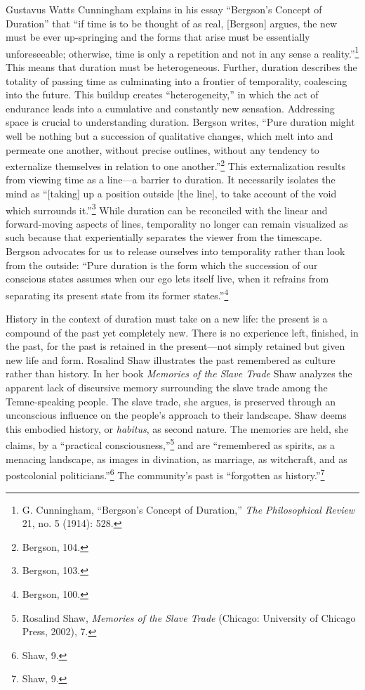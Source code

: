 Gustavus Watts Cunningham explains in his essay ``Bergson's Concept of
Duration'' that ``if time is to be thought of as real, {[}Bergson{]}
argues, the new must be ever up-springing and the forms that arise must
be essentially unforeseeable; otherwise, time is only a repetition and
not in any sense a reality.''\footnote{G. Cunningham, ``Bergson's
  Concept of Duration,'' \emph{The Philosophical Review} 21, no. 5
  (1914): 528.} This means that duration must be heterogeneous. Further,
duration describes the totality of passing time as culminating into a
frontier of temporality, coalescing into the future. This buildup
creates ``heterogeneity,'' in which the act of endurance leads into a
cumulative and constantly new sensation. Addressing space is crucial to
understanding duration. Bergson writes, ``Pure duration might well be
nothing but a succession of qualitative changes, which melt into and
permeate one another, without precise outlines, without any tendency to
externalize themselves in relation to one another.''\footnote{Bergson,
  104.} This externalization results from viewing time as a line---a
barrier to duration. It necessarily isolates the mind as ``{[}taking{]}
up a position outside {[}the line{]}, to take account of the void which
surrounds it.''\footnote{Bergson, 103.} While duration can be reconciled
with the linear and forward-moving aspects of lines, temporality no
longer can remain visualized as such because that experientially
separates the viewer from the timescape. Bergson advocates for us to
release ourselves into temporality rather than look from the outside:
``Pure duration is the form which the succession of our conscious states
assumes when our ego lets itself live, when it refrains from separating
its present state from its former states.''\footnote{Bergson, 100.}

History in the context of duration must take on a new life: the present
is a compound of the past yet completely new. There is no experience
left, finished, in the past, for the past is retained in the
present---not simply retained but given new life and form. Rosalind Shaw
illustrates the past remembered as culture rather than history. In her
book \emph{Memories of the Slave Trade} Shaw analyzes the apparent lack
of discursive memory surrounding the slave trade among the
Temne-speaking people. The slave trade, she argues, is preserved through
an unconscious influence on the people's approach to their landscape.
Shaw deems this embodied history, or \emph{habitus}, as second nature.
The memories are held, she claims, by a ``practical
consciousness,''\footnote{Rosalind Shaw, \emph{Memories of the Slave
  Trade} (Chicago: University of Chicago Press, 2002), 7.} and are
``remembered as spirits, as a menacing landscape, as images in
divination, as marriage, as witchcraft, and as postcolonial
politicians.''\footnote{Shaw, 9.} The community's past is ``forgotten as
history.''\footnote{Shaw, 9.}

